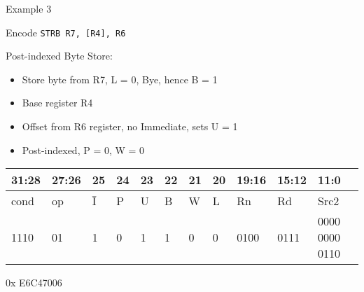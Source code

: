 \documentclass[aspectratio=169]{beamer}
\begin{document}
\begin{frame}{Example 3}
    \begin{tcolorbox}[
        enhanced,
        colback=androidBlueLight,
        colframe=androidBlue,
        arc=5pt,
        boxrule=1pt,
        title=\textbf{},
        fonttitle=\bfseries,
        coltitle=black,
        top=10pt,
        bottom=8pt,
        left=8pt,
        right=8pt,
        attach boxed title to top left={xshift=10pt, yshift=-\tcboxedtitleheight/2},
        boxed title style={
            colback=androidBlue,    
            colframe=androidBlue,
            arc=3pt,
            boxrule=0pt,
            left=6pt, right=6pt,
            top=3pt, bottom=3pt
        }
        ]
        Encode     \texttt{STRB R7, [R4], R6}
    \end{tcolorbox}

    Post-indexed Byte Store:
    \begin{itemize}
        \item Store byte from R7, L = 0, Bye, hence B = 1
        \item Base register R4
        \item Offset from R6 register, no Immediate, sets U = 1
        \item Post-indexed, P = 0, W = 0
    \end{itemize}

    \footnotesize 
    \begin{center}
        \renewcommand{\arraystretch}{1.2}
        \begin{tabular}{|p{3.0em}|p{3.0em}|p{1.5em}|p{1.5em}|p{1.5em}|p{1.5em}|p{1.5em}|p{1.5em}|p{3.0em}|p{3.0em}|p{7.0em}|}
        \hline
        31:28 & 27:26 & 25 & 24 & 23 & 22 & 21 & 20 & 19:16 & 15:12 & 11:0\\
        \hline
        cond & op & \=I & P & U & B & W & L & Rn & Rd & Src2\\
        \hline
        1110 & 01 & 1 & 0 & 1 & 1 & 0 & 0 & 0100 & 0111 & 0000 0000 0110\\
        \hline
        \end{tabular}

        \vspace{0.5em}

        0x E6C47006
    \end{center}
\end{frame}
\end{document}
